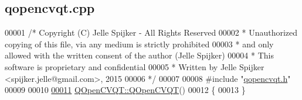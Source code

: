 \hypertarget{qopencvqt_8cpp_source}{}\subsection{qopencvqt.\+cpp}
\label{qopencvqt_8cpp_source}

\begin{DoxyCode}
00001 \textcolor{comment}{/* Copyright (C) Jelle Spijker - All Rights Reserved}
00002 \textcolor{comment}{ * Unauthorized copying of this file, via any medium is strictly prohibited}
00003 \textcolor{comment}{ * and only allowed with the written consent of the author (Jelle Spijker)}
00004 \textcolor{comment}{ * This software is proprietary and confidential}
00005 \textcolor{comment}{ * Written by Jelle Spijker <spijker.jelle@gmail.com>, 2015}
00006 \textcolor{comment}{ */}
00007 
00008 \textcolor{preprocessor}{#include "\hyperlink{qopencvqt_8h}{qopencvqt.h}"}
00009 
00010 
\hypertarget{qopencvqt_8cpp_source_l00011}{}\hyperlink{class_q_open_c_v_q_t_a6c108b923cac9d18ae3fd75215aca6a5}{00011} \hyperlink{class_q_open_c_v_q_t_a6c108b923cac9d18ae3fd75215aca6a5}{QOpenCVQT::QOpenCVQT}()
00012 \{
00013 \}
\end{DoxyCode}
